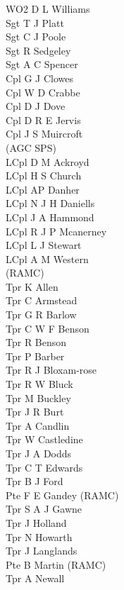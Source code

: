 \begin{multicols}{3}
  \scriptsize
  \noindent
  WO2 D L Williams \\
  Sgt T J Platt \\
  Sgt C J Poole \\
  Sgt R Sedgeley \\
  Sgt A C Spencer \\
  Cpl G J Clowes \\
  Cpl W D Crabbe \\
  Cpl D J Dove \\
  Cpl D R E Jervis \\
  Cpl J S Muircroft \\ \indent  (AGC SPS) \\
  LCpl D M Ackroyd \\
  LCpl H S Church \\
  LCpl AP Danher \\
  LCpl N J H Daniells \\
  LCpl J A Hammond \\
  LCpl R J P Mcanerney \\
  LCpl L J Stewart \\
  LCpl A M Western \\ \indent  (RAMC) \\
  Tpr K Allen \\
  Tpr C Armstead \\
  Tpr G R Barlow \\
  Tpr C W F Benson \\
  Tpr R Benson \\
  Tpr P Barber \\
  Tpr R J Bloxam-rose \\
  Tpr R W Bluck \\
  Tpr M Buckley \\
  Tpr J R Burt \\
  Tpr A Candlin \\
  Tpr W Castledine \\
  Tpr J A Dodds \\
  Tpr C T Edwards \\
  Tpr B J Ford \\
  Pte F E Gandey (RAMC) \\
  Tpr S A J Gawne \\
  Tpr J Holland \\
  Tpr N Howarth \\
  Tpr J Langlands \\
  Pte B Martin (RAMC) \\
  Tpr A Newall \\

\end{multicols}
